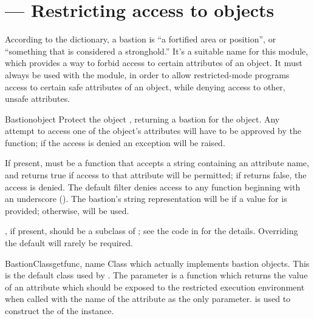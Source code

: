 \section{ ---
         Restricting access to objects}




According to the dictionary, a bastion is ``a fortified area or
position'', or ``something that is considered a stronghold.''  It's a
suitable name for this module, which provides a way to forbid access
to certain attributes of an object.  It must always be used with the
 module, in order to allow restricted-mode programs
access to certain safe attributes of an object, while denying access
to other, unsafe attributes.


\begin{funcdesc}{Bastion}{object}
Protect the object , returning a bastion for the
object.  Any attempt to access one of the object's attributes will
have to be approved by the  function; if the access is
denied an  exception will be raised.

If present,  must be a function that accepts a string
containing an attribute name, and returns true if access to that
attribute will be permitted; if  returns false, the access
is denied.  The default filter denies access to any function beginning
with an underscore (\character{_}).  The bastion's string representation
will be  if a value for
 is provided; otherwise,  will be
used.

, if present, should be a subclass of ; 
see the code in  for the details.  Overriding the
default  will rarely be required.
\end{funcdesc}


\begin{classdesc}{BastionClass}{getfunc, name}
Class which actually implements bastion objects.  This is the default
class used by .  The  parameter is a
function which returns the value of an attribute which should be
exposed to the restricted execution environment when called with the
name of the attribute as the only parameter.   is used to
construct the  of the  instance.
\end{classdesc}
